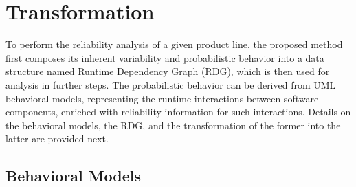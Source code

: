 \section{Transformation   \label{subsec:transformation}}


To perform the reliability analysis of a given product line, the proposed method
first composes its inherent variability and probabilistic behavior into a data
structure named Runtime Dependency Graph (RDG), which is then used for analysis
in further steps.  The probabilistic behavior can be derived from UML behavioral
models, representing the runtime interactions between software components,
enriched with reliability information for such interactions.  Details on the
behavioral models, the RDG, and the transformation of the former into the latter
are provided next.







\subsection{Behavioral Models \label{subsec:behavioralModels}}

